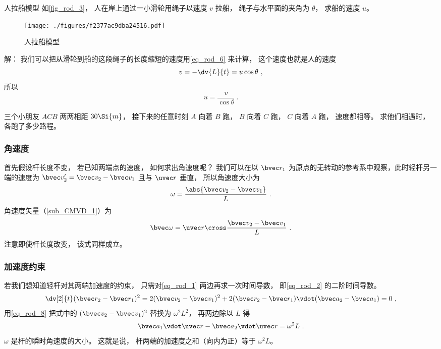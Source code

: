 \begin{example}{人拉船模型}\label{ex_rod_2}
如\autoref{fig_rod_3}， 人在岸上通过一小滑轮用绳子以速度 $v$ 拉船， 绳子与水平面的夹角为 $\theta$， 求船的速度 $u$。
\begin{figure}[ht]
\centering
\texttt{[image: ./figures/f2377ac9dba24516.pdf]}
\caption{人拉船模型} \label{fig_rod_3}
\end{figure}

解： 我们可以把从滑轮到船的这段绳子的长度缩短的速度用\autoref{eq_rod_6} 来计算， 这个速度也就是人的速度
\begin{equation}
v = -\dv{L}{t} = u \cos\theta~,
\end{equation}
所以
\begin{equation}
u = \frac{v}{\cos\theta}~.
\end{equation}
\end{example}

\begin{exercise}{}
三个小朋友 $ACB$ 两两相距 $30\Si{m}$， 接下来的任意时刻 $A$ 向着 $B$ 跑， $B$ 向着 $C$ 跑， $C$ 向着 $A$ 跑， 速度都相等。 求他们相遇时， 各跑了多少路程。
\end{exercise}

\subsubsection{角速度}

首先假设杆长度不变， 若已知两端点的速度， 如何求出角速度呢？ 我们可以在以 $\bvec r_1$ 为原点的无转动的参考系中观察，此时轻杆另一端的速度为 $\bvec v_2' = \bvec v_2 - \bvec v_1$ 且与 $\uvec r$ 垂直， 所以角速度大小为
\begin{equation}\label{eq_rod_8}
\omega = \frac{\abs{\bvec v_2 - \bvec v_1}}{L}~.
\end{equation}
角速度矢量（\autoref{sub_CMVD_1}）为
\begin{equation}\label{eq_rod_4}
\bvec \omega = \uvec r \cross \frac{\bvec v_2 - \bvec v_1}{L}~.
\end{equation}
注意即使杆长度改变， 该式同样成立。

\subsubsection{加速度约束}
若我们想知道轻杆对其两端加速度的约束， 只需对\autoref{eq_rod_1} 两边再求一次时间导数， 即\autoref{eq_rod_2} 的二阶时间导数。
\begin{equation}
\dv[2]{t} (\bvec r_2 - \bvec r_1)^2 = 2(\bvec v_2 - \bvec v_1)^2 + 2(\bvec r_2 - \bvec r_1) \vdot (\bvec a_2 - \bvec a_1) = 0~,
\end{equation}
用\autoref{eq_rod_8} 把式中的 $(\bvec v_2 - \bvec v_1)^2$ 替换为 $\omega^2 L^2$， 再两边除以 $L$ 得
\begin{equation}\label{eq_rod_5}
\bvec a_1 \vdot \uvec r - \bvec a_2 \vdot \uvec r  = \omega^2 L~.
\end{equation}
$\omega$ 是杆的瞬时角速度的大小。 这就是说， 杆两端的加速度之和（向内为正）等于 $\omega^2L$。

